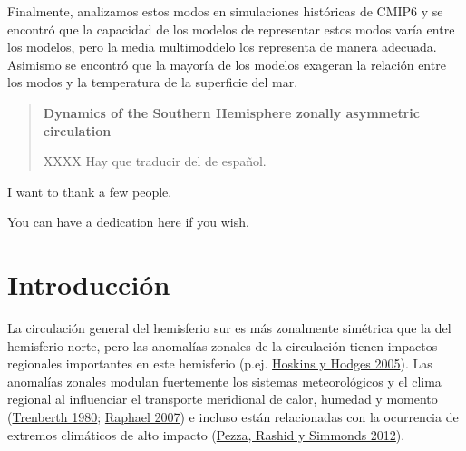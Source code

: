 \documentclass[12pt,oneside,a4paper]{reedthesis}
\begin{document}
\begin{resumen}
    Finalmente, analizamos estos modos en simulaciones históricas de CMIP6 y se encontró que la capacidad de los modelos de representar estos modos varía entre los modelos, pero la media multimoddelo los representa de manera adecuada.
    Asimismo se encontró que la mayoría de los modelos exageran la relación entre los modos y la temperatura de la superficie del mar.
  \end{resumen}


  \begin{abstract}
    \textbf{Dynamics of the Southern Hemisphere zonally asymmetric circulation}

    XXXX Hay que traducir del de español.
  \end{abstract}



  \begin{acknowledgements}
    I want to thank a few people.
  \end{acknowledgements}


  \hypersetup{linkcolor=black}
  \setcounter{secnumdepth}{2}
  \setcounter{tocdepth}{2}
  \tableofcontents

  \listoftables

  \listoffigures

  \begin{dedication}
    You can have a dedication here if you wish.
  \end{dedication}

\mainmatter %
\pagestyle{fancyplain} %

\hypertarget{intro}{%
\chapter{Introducción}\label{intro}}

La circulación general del hemisferio sur es más zonalmente simétrica que la del hemisferio norte, pero las anomalías zonales de la circulación tienen impactos regionales importantes en este hemisferio (p.ej. \protect\hyperlink{ref-hoskins2005}{Hoskins y Hodges 2005}).
Las anomalías zonales modulan fuertemente los sistemas meteorológicos y el clima regional al influenciar el transporte meridional de calor, humedad y momento (\protect\hyperlink{ref-trenberth1980a}{Trenberth 1980}; \protect\hyperlink{ref-raphael2007}{Raphael 2007}) e incluso están relacionadas con la ocurrencia de extremos climáticos de alto impacto (\protect\hyperlink{ref-pezza2012}{Pezza, Rashid y Simmonds 2012}).
\end{document}
